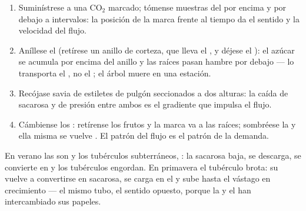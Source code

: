 \begin{method}\label{met:b1:plant-transport:translocation}
\begin{enumerate}
  \item Suminístrese a una  $\mathrm{CO_2}$ marcado; tómense muestras
        del  por encima y por debajo a intervalos: la posición de la
        marca frente al tiempo da el sentido y la velocidad del flujo.
  \item Aníllese el  (retírese un anillo de corteza, que lleva el
        , y déjese el ): el azúcar se acumula por encima del
        anillo y las raíces pasan hambre por debajo --- lo transporta el
        , no el ; el árbol muere en una estación.
  \item Recójase savia de estiletes de pulgón seccionados a dos alturas: la
        caída de sacarosa y de presión entre ambos es el gradiente que
        impulsa el flujo.
  \item Cámbiense los : retírense los frutos y la marca va a las
        raíces; sombréese la  y ella misma se vuelve . El patrón
        del flujo es el patrón de la demanda.
\end{enumerate}
\end{method}

\begin{example}\label{ex:b1:plant-transport:potato}
En verano las  son  y los tubérculos subterráneos, : la
sacarosa baja, se descarga, se convierte en  y los tubérculos
engordan. En primavera el tubérculo brota: su  vuelve a convertirse
en sacarosa, se carga en el  y sube hasta el vástago en crecimiento
--- el mismo tubo, el sentido opuesto, porque la  y el  han
intercambiado sus papeles.
\end{example}

